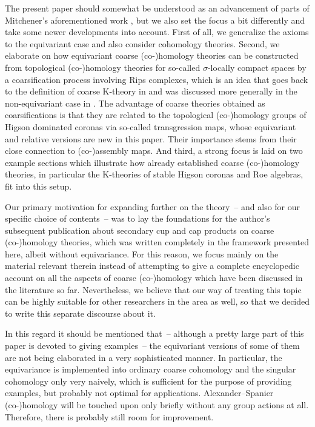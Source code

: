 \documentclass[pdftex]{sigma}
\numberwithin{equation}{section}
\theoremstyle{definition}
\newcommand{\K}{\mathrm{K}}
\begin{document}
The present paper should somewhat be understood as an advancement of parts of Mitchener's aforementioned work \cite{MitchenerCoarse}, but we also set the focus a bit differently and take some newer developments into account. First of all, we generalize the axioms to the equivariant case and also consider cohomology theories. Second, we elaborate on how equivariant coarse \mbox{(co-)}homology theories can be constructed from topological \mbox{(co-)}homology theories for so-called $\sigma$-locally compact spaces by a coarsification process involving Rips complexes, which is an idea that goes back to the definition of coarse $\K$-theory in \cite{EmeMeyDualizing} and was discussed more generally in the non-equivariant case in \cite[Section~4]{EngelWulff}.
The advantage of coarse theories obtained as coarsifications is that they are related to the topological \mbox{(co-)}homology groups of Higson dominated coronas via so-called transgression maps, whose equivariant and relative versions are new in this paper.
Their importance stems from their close connection to \mbox{(co-)}assembly maps.
And third, a strong focus is laid on two example sections which illustrate how already established coarse \mbox{(co-)}homology theories, in particular the $\K$-theories of stable Higson coronas and Roe algebras, fit into this setup.

Our primary motivation for expanding further on the theory~-- and also for our specific choice of contents~-- was to lay the foundations for the author's subsequent publication \cite{wulff2020secondary} about secondary cup and cap products on coarse \mbox{(co-)}homology theories, which was written completely in the framework presented here, albeit without equivariance.
For this reason, we focus mainly on the material relevant therein instead of attempting to give a complete encyclopedic account on all the aspects of coarse (co-)homology which have been discussed in the literature so far. Nevertheless, we believe that our way of treating this topic can be highly suitable for other researchers in the area as well, so that we decided to write this separate discourse about it.

In this regard it should be mentioned that~-- although a pretty large part of this paper is devoted to giving examples~-- the equivariant versions of some of them are not being elaborated in a very sophisticated manner. In particular, the equivariance is implemented into ordinary coarse cohomology and the singular cohomology only very naively, which is sufficient for the purpose of providing examples, but probably not optimal for applications. Alexander--Spanier \mbox{(co-)}homology will be touched upon only briefly without any group actions at all.
Therefore, there is probably still room for improvement.
\end{document}
